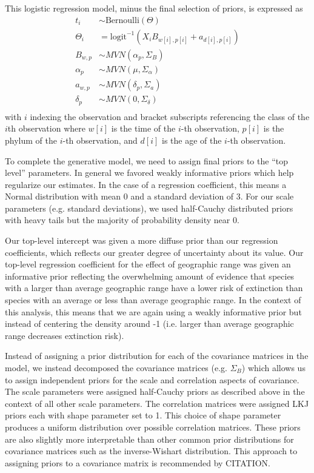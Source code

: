 \documentclass[12pt,letterpaper]{article}
\begin{document}
This logistic regression model, minus the final selection of priors, is expressed as 
\begin{equation}
  \begin{aligned}
    t_{i} &\sim \text{Bernoulli}(\Theta) \\
    \Theta_{i} &= \text{logit}^{-1} (X_{i} B_{w[i], p[i]} + a_{d[i], p[i]}) \\
    B_{w, p} &\sim MVN(\alpha_{p}, \Sigma_{B}) \\
    \alpha_{p} &\sim MVN(\mu, \Sigma_{\alpha}) \\
    a_{w, p} &\sim MVN(\delta_{p}, \Sigma_{a}) \\
    \delta_{p} &\sim MVN(0, \Sigma_{\delta}) \\
  \end{aligned}
  \label{eq:core}
\end{equation}
with \(i\) indexing the observation and bracket subscripts referencing the class of the \(i\)th observation where \(w[i]\) is the time of the \(i\)-th observation, \(p[i]\) is the phylum of the \(i\)-th observation, and \(d[i]\) is the age of the \(i\)-th observation. 

To complete the generative model, we need to assign final priors to the ``top level'' parameters. In general we favored weakly informative priors which help regularize our estimates. In the case of a regression coefficient, this means a Normal distribution with mean 0 and a standard deviation of 3. For our scale parameters (e.g. standard deviations), we used half-Cauchy distributed priors with heavy tails but the majority of probability density near 0.

Our top-level intercept was given a more diffuse prior than our regression coefficients, which reflects our greater degree of uncertainty about its value. Our top-level regression coefficient for the effect of geographic range was given an informative prior reflecting the overwhelming amount of evidence that species with a larger than average geographic range have a lower risk of extinction than species with an average or less than average geographic range. In the context of this analysis, this means that we are again using a weakly informative prior but instead of centering the density around -1 (i.e. larger than average geographic range decreases extinction risk).

Instead of assigning a prior distribution for each of the covariance matrices in the model, we instead decomposed the covariance matrices (e.g. \(\Sigma_{B}\)) which allows us to assign independent priors for the scale and correlation aspects of covariance. The scale parameters were assigned half-Cauchy priors as described above in the context of all other scale parameters. The correlation matrices were assigned LKJ priors each with shape parameter set to 1. This choice of shape parameter produces a uniform distribution over possible correlation matrices. These priors are also slightly more interpretable than other common prior distributions for covariance matrices such as the inverse-Wishart distribution. This approach to assigning priors to a covariance matrix is recommended by CITATION.
\end{document}
